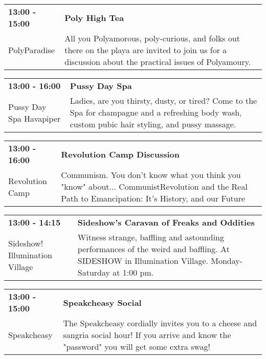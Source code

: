 \begin{tabular}{ p{1in} p{2.2in} }
    \textbf{13:00 - 15:00} & \textbf{Poly High Tea} \\
    PolyParadise \newline  & All you Polyamorous, poly-curious, and folks out there on the playa are invited to join us for a discussion about the practical issues of Polyamoury. \\
    \hline 
\end{tabular}
    
\begin{tabular}{ p{1in} p{2.2in} }
    \textbf{13:00 - 16:00} & \textbf{Pussy Day Spa} \\
    Pussy Day Spa \newline Havapiper & Ladies, are you thirsty, dusty, or tired? Come to the Spa for champagne and a refreshing body wash, custom pubic hair styling, and pussy massage. \\
    \hline 
\end{tabular}
    
\begin{tabular}{ p{1in} p{2.2in} }
    \textbf{13:00 - 16:00} & \textbf{Revolution Camp Discussion} \\
    Revolution Camp \newline  & Communism. You don't know what you think you "know" about... CommunistRevolution and the Real Path to Emancipation: It's History, and our Future \\
    \hline 
\end{tabular}
    
\begin{tabular}{ p{1in} p{2.2in} }
    \textbf{13:00 - 14:15} & \textbf{Sideshow's Caravan of Freaks and Oddities} \\
    Sideshow! \newline Illumination Village & Witness strange, baffling and astounding performances of the weird and baffling. At SIDESHOW in Illumination Village. Monday-Saturday at 1:00 pm. \\
    \hline 
\end{tabular}
    
\begin{tabular}{ p{1in} p{2.2in} }
    \textbf{13:00 - 15:00} & \textbf{Speakcheasy Social} \\
    Speakcheasy \newline  & The Speakcheasy cordially invites you to a cheese and sangria social hour! If you arrive and know the "password" you will get some extra swag! \\
    \hline 
\end{tabular}
    
